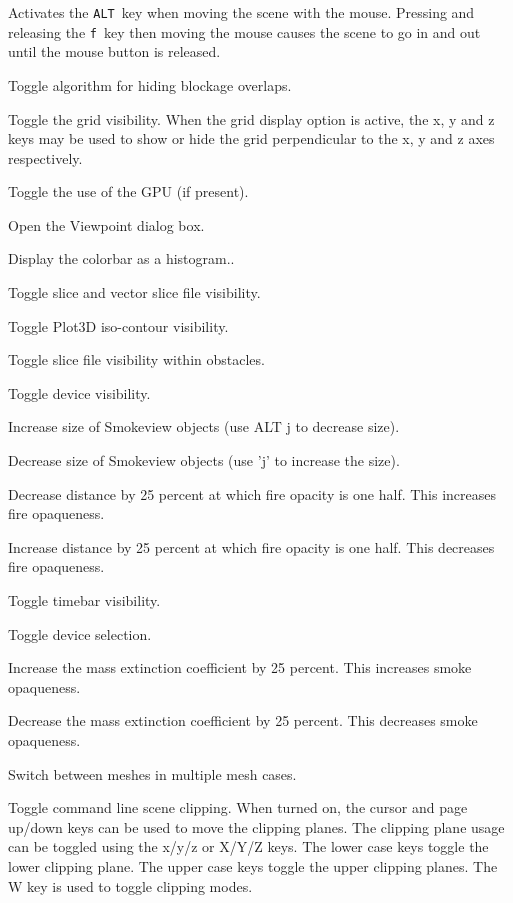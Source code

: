 \documentclass[11pt,twoside]{book}
\newcommand{\kitem}[1]{\item[{\bf {\tt #1 \  }} \hfill]}
\begin{document}
\kitem{f}Activates the {\tt ALT}\ key when moving the scene with the mouse.
Pressing and releasing the {\tt f}\ key then moving the mouse causes the scene to go in and out until the
mouse button is released.

\kitem{F}Toggle algorithm for hiding blockage overlaps.

\kitem{g}Toggle the grid visibility.  When the grid display option
is active, the x, y and z keys may be used to show or hide the
grid perpendicular to the x, y and z axes respectively.

\kitem{G}Toggle the use of the GPU (if present).

\kitem{ALT g}Open the Viewpoint dialog box.

\kitem{h}Display the colorbar as a histogram..

\kitem{H}Toggle slice and vector slice file  visibility.

\kitem{i}Toggle Plot3D iso-contour visibility.

\kitem{I}Toggle slice file visibility within obstacles.

\kitem{ALT i}Toggle device visibility.

\kitem{j,J}Increase size of Smokeview objects (use ALT j to decrease size).

\kitem{ALT j}Decrease size of Smokeview objects (use 'j' to increase the size).

\kitem{k}Decrease distance by 25 percent at which fire opacity is one half. This increases fire opaqueness.

\kitem{K}Increase distance by 25 percent at which fire opacity is one half. This decreases fire opaqueness.

\kitem{CTRL k}Toggle timebar visibility.

\kitem{ALT k}Toggle device selection.

\kitem{l}Increase the mass extinction coefficient by 25 percent.  This increases smoke opaqueness.

\kitem{L, ALT l}Decrease the mass extinction coefficient by 25 percent.  This decreases smoke opaqueness.

\kitem{m}Switch between meshes in multiple mesh cases.

\kitem{M}Toggle command line scene clipping.  When turned on, the
cursor and page up/down keys can be used to move the clipping planes.
The clipping plane usage can be toggled using the x/y/z or X/Y/Z keys.
The lower case keys toggle the lower clipping plane.  The upper case
keys toggle the upper clipping planes.
The W key is used to toggle clipping modes.
\end{document}
